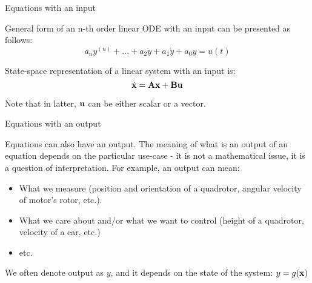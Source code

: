 \documentclass{beamer}
\begin{document}
\begin{frame}{Equations with an input}
	\begin{flushleft}
		
		General form of an n-th order linear ODE with an input can be presented as follows:
		\begin{equation}
			a_n y^{(n)} + 
			... +
			a_2 \ddot{y} + a_1 \dot{y} + 
			a_0 y = u(t)
		\end{equation}
	
	\bigskip
		
		State-space representation of a linear system with an input is:
		\begin{equation}
			\dot{\mathbf{x}} = \mathbf{A} \mathbf{x} + \mathbf{B} \mathbf{u}
		\end{equation}
		
		Note that in latter, $\mathbf{u}$ can be either scalar or a vector.
		
	\end{flushleft}
\end{frame}







\begin{frame}{Equations with an output}
	\begin{flushleft}
		
		Equations can also have an output. The meaning of what is an output of an equation depends on the particular use-case - it is not a mathematical issue, it is a question of interpretation. For example, an output can mean:
		
		\begin{itemize}
			\item What we measure (position and orientation of a quadrotor, angular velocity of motor's rotor, etc.).
			
			\item What we care about and/or what we want to control (height of a quadrotor, velocity of a car, etc.)
			
			\item etc.
		\end{itemize}
		
		We often denote output as $y$, and it depends on the state of the system: $y = g(\mathbf{x})$
		
	\end{flushleft}
\end{frame}
\end{document}

